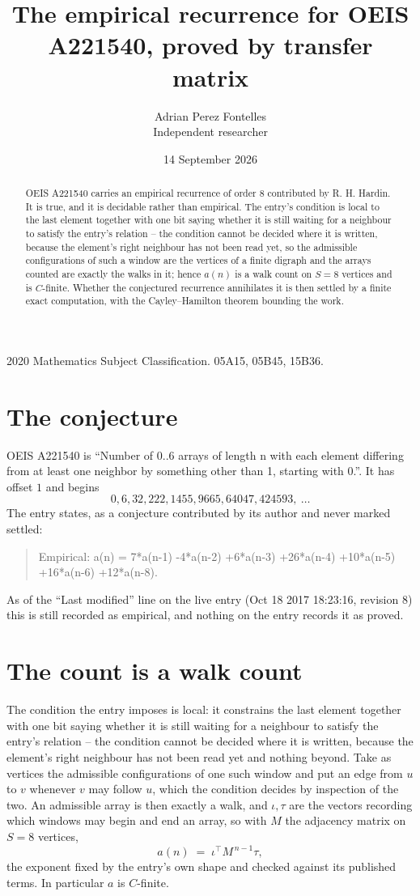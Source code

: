 \documentclass[11pt,a4paper]{article}
\title{The empirical recurrence for OEIS A221540, proved by transfer matrix}
\author{Adrian Perez Fontelles\\ \small Independent researcher}
\date{14 September 2026}
\theoremstyle{plain}
\theoremstyle{definition}
\begin{document}
\maketitle

\begin{abstract}
OEIS A221540 carries an empirical recurrence of order $8$ contributed by R. H. Hardin. It is
true, and it is decidable rather than empirical. The entry's condition is local to the last element together with one bit saying whether it is still waiting for a neighbour to satisfy the entry's relation -- the condition cannot be decided where it is written, because the element's right neighbour has not been read yet, so
the admissible configurations of such a window are the vertices of a finite digraph and the
arrays counted are exactly the walks in it; hence $a(n)$ is a walk count on $S=8$ vertices
and is $C$-finite. Whether the conjectured recurrence annihilates it is then settled by a
finite exact computation, with the Cayley--Hamilton theorem bounding the work.
\end{abstract}

\noindent\small 2020 Mathematics Subject Classification. 05A15, 05B45, 15B36.\normalsize

\section{The conjecture}

OEIS A221540 is ``Number of 0..6 arrays of length n with each element differing from at least one neighbor by something other than 1, starting with 0.''. It has offset $1$ and begins
\[
0, 6, 32, 222, 1455, 9665, 64047, 424593,\ \dots
\]
The entry states, as a conjecture contributed by its author and never marked settled:
\begin{quote}
Empirical: a(n) = 7*a(n-1) -4*a(n-2) +6*a(n-3) +26*a(n-4) +10*a(n-5) +16*a(n-6) +12*a(n-8).
\end{quote}
As of the ``Last modified'' line on the live entry (Oct 18 2017 18:23:16, revision 8) this is still
recorded as empirical, and nothing on the entry records it as proved.

\section{The count is a walk count}

The condition the entry imposes is local: it constrains the last element together with one bit saying whether it is still waiting for a neighbour to satisfy the entry's relation -- the condition cannot be decided where it is written, because the element's right neighbour has not been read yet and nothing beyond. Take as vertices the admissible configurations of one such window and put an edge from $u$ to $v$ whenever $v$ may follow $u$, which the condition decides by inspection of the two.
An admissible array is then exactly a walk, and $\iota,\tau$ are the vectors recording which windows may begin and end an array, so with $M$ the adjacency matrix on $S=8$ vertices,
\[
a(n)\;=\;\iota^{\!\top}M^{\,n-1}\tau ,
\]
the exponent fixed by the entry's own shape and checked against its published terms. In
particular $a$ is $C$-finite.
\end{document}
